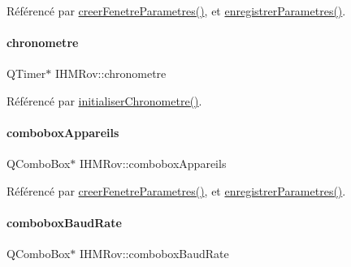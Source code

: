 Référencé par \hyperlink{class_i_h_m_rov_aed451139ac09ef18b7c92637761d80ce}{creer\+Fenetre\+Parametres()}, et \hyperlink{class_i_h_m_rov_a94d31f4e748f3e4549eab42c8bc7e367}{enregistrer\+Parametres()}.

\mbox{\label{class_i_h_m_rov_ac8733c564d7beea8b669e62544a006a5}} 
\paragraph{\texorpdfstring{chronometre}{chronometre}}
{\footnotesize\ttfamily Q\+Timer$\ast$ I\+H\+M\+Rov\+::chronometre\hspace{0.3cm}{\ttfamily [private]}}



Référencé par \hyperlink{class_i_h_m_rov_a64002e867300c8aff2ebd4568acc107e}{initialiser\+Chronometre()}.

\mbox{\label{class_i_h_m_rov_a12b970f1d2a170f14a01a684787904a5}} 
\paragraph{\texorpdfstring{combobox\+Appareils}{comboboxAppareils}}
{\footnotesize\ttfamily Q\+Combo\+Box$\ast$ I\+H\+M\+Rov\+::combobox\+Appareils\hspace{0.3cm}{\ttfamily [private]}}



Référencé par \hyperlink{class_i_h_m_rov_aed451139ac09ef18b7c92637761d80ce}{creer\+Fenetre\+Parametres()}, et \hyperlink{class_i_h_m_rov_a94d31f4e748f3e4549eab42c8bc7e367}{enregistrer\+Parametres()}.

\mbox{\label{class_i_h_m_rov_a542c0cf87de612cd529b0753b60e4f95}} 
\paragraph{\texorpdfstring{combobox\+Baud\+Rate}{comboboxBaudRate}}
{\footnotesize\ttfamily Q\+Combo\+Box$\ast$ I\+H\+M\+Rov\+::combobox\+Baud\+Rate\hspace{0.3cm}{\ttfamily [private]}}



